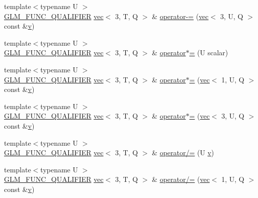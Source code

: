 \begin{DoxyCompactItemize}
\item 
{\footnotesize template$<$typename U $>$ }\\\hyperlink{setup_8hpp_a33fdea6f91c5f834105f7415e2a64407}{G\+L\+M\+\_\+\+F\+U\+N\+C\+\_\+\+Q\+U\+A\+L\+I\+F\+I\+ER} \hyperlink{structglm_1_1vec}{vec}$<$ 3, T, Q $>$ \& \hyperlink{structglm_1_1vec_3_013_00_01_t_00_01_q_01_4_a4430e8bea2a290bbcd6507102d37914d}{operator-\/=} (\hyperlink{structglm_1_1vec}{vec}$<$ 3, U, Q $>$ const \&\hyperlink{_s_d_l__opengl_8h_a10a82eabcb59d2fcd74acee063775f90}{v})
\item 
{\footnotesize template$<$typename U $>$ }\\\hyperlink{setup_8hpp_a33fdea6f91c5f834105f7415e2a64407}{G\+L\+M\+\_\+\+F\+U\+N\+C\+\_\+\+Q\+U\+A\+L\+I\+F\+I\+ER} \hyperlink{structglm_1_1vec}{vec}$<$ 3, T, Q $>$ \& \hyperlink{structglm_1_1vec_3_013_00_01_t_00_01_q_01_4_ac8d11ce47b7e6cf747d9e9710c422fb3}{operator$\ast$=} (U scalar)
\item 
{\footnotesize template$<$typename U $>$ }\\\hyperlink{setup_8hpp_a33fdea6f91c5f834105f7415e2a64407}{G\+L\+M\+\_\+\+F\+U\+N\+C\+\_\+\+Q\+U\+A\+L\+I\+F\+I\+ER} \hyperlink{structglm_1_1vec}{vec}$<$ 3, T, Q $>$ \& \hyperlink{structglm_1_1vec_3_013_00_01_t_00_01_q_01_4_abf00e0a1c52a2ea28c89b50edec4b722}{operator$\ast$=} (\hyperlink{structglm_1_1vec}{vec}$<$ 1, U, Q $>$ const \&\hyperlink{_s_d_l__opengl_8h_a10a82eabcb59d2fcd74acee063775f90}{v})
\item 
{\footnotesize template$<$typename U $>$ }\\\hyperlink{setup_8hpp_a33fdea6f91c5f834105f7415e2a64407}{G\+L\+M\+\_\+\+F\+U\+N\+C\+\_\+\+Q\+U\+A\+L\+I\+F\+I\+ER} \hyperlink{structglm_1_1vec}{vec}$<$ 3, T, Q $>$ \& \hyperlink{structglm_1_1vec_3_013_00_01_t_00_01_q_01_4_a20170b8b71ce0a479ea43b5d4690a1a5}{operator$\ast$=} (\hyperlink{structglm_1_1vec}{vec}$<$ 3, U, Q $>$ const \&\hyperlink{_s_d_l__opengl_8h_a10a82eabcb59d2fcd74acee063775f90}{v})
\item 
{\footnotesize template$<$typename U $>$ }\\\hyperlink{setup_8hpp_a33fdea6f91c5f834105f7415e2a64407}{G\+L\+M\+\_\+\+F\+U\+N\+C\+\_\+\+Q\+U\+A\+L\+I\+F\+I\+ER} \hyperlink{structglm_1_1vec}{vec}$<$ 3, T, Q $>$ \& \hyperlink{structglm_1_1vec_3_013_00_01_t_00_01_q_01_4_a04e2525807011b5085f89df8dd94ff3d}{operator/=} (U \hyperlink{_s_d_l__opengl_8h_a10a82eabcb59d2fcd74acee063775f90}{v})
\item 
{\footnotesize template$<$typename U $>$ }\\\hyperlink{setup_8hpp_a33fdea6f91c5f834105f7415e2a64407}{G\+L\+M\+\_\+\+F\+U\+N\+C\+\_\+\+Q\+U\+A\+L\+I\+F\+I\+ER} \hyperlink{structglm_1_1vec}{vec}$<$ 3, T, Q $>$ \& \hyperlink{structglm_1_1vec_3_013_00_01_t_00_01_q_01_4_a54e324b77b2efc8926c0436608709799}{operator/=} (\hyperlink{structglm_1_1vec}{vec}$<$ 1, U, Q $>$ const \&\hyperlink{_s_d_l__opengl_8h_a10a82eabcb59d2fcd74acee063775f90}{v})

\end{DoxyCompactItemize}
